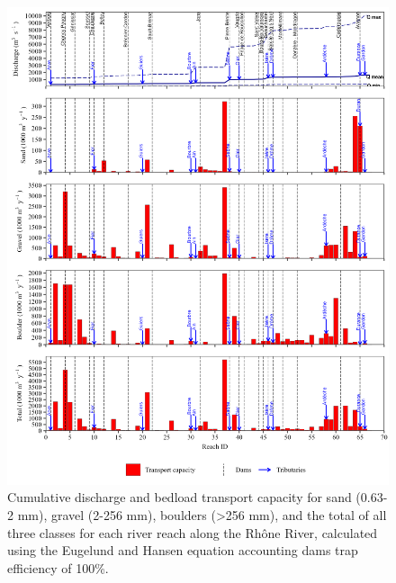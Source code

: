 \documentclass[
]{book}
\begin{document}
\begin{figure}
\includegraphics[width=26.24in]{img/res_cascade/res_E3_eE&H/plots_tr_cap-silt/tr_cap_res_sum_hy_E3_eE&H} \caption{Cumulative discharge and bedload transport capacity for sand (0.63-2 mm), gravel (2-256 mm), boulders (>256 mm), and the total of all three classes for each river reach along the Rhône River, calculated using the Eugelund and Hansen equation accounting dams trap efficiency of 100\%.}\label{fig:TrcE3eE}
\end{figure}
\end{document}
